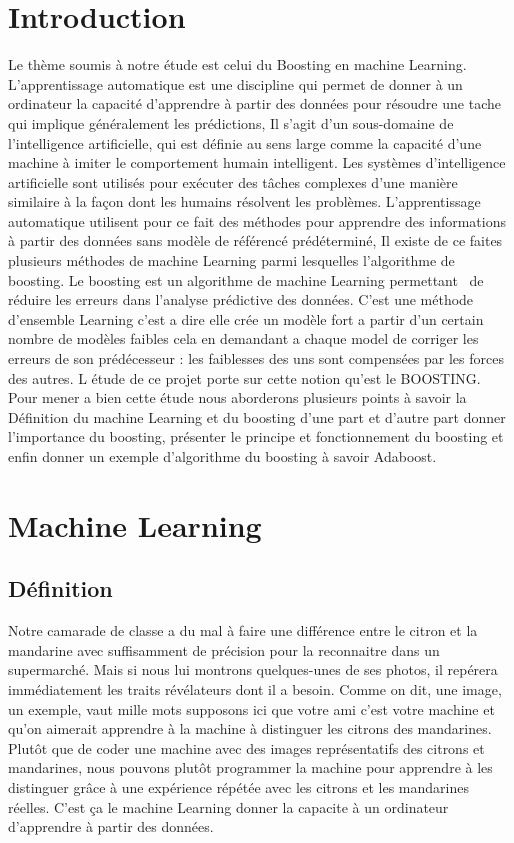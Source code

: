 \documentclass[french,a4paper,12pt]{article}
\begin{document}
 \begin{center}
 \tableofcontents
 \end{center}
\newpage



\section{Introduction}
\quad Le thème soumis à notre étude est celui du Boosting en machine Learning. L’apprentissage automatique est une discipline qui permet de donner à un ordinateur la capacité d’apprendre à partir des données pour résoudre une tache qui implique généralement les prédictions, Il s’agit d’un sous-domaine de l'intelligence artificielle, qui est définie au sens large comme la capacité d'une machine à imiter le comportement humain intelligent. Les systèmes d'intelligence artificielle sont utilisés pour exécuter des tâches complexes d'une manière similaire à la façon dont les humains résolvent les problèmes. L'apprentissage automatique utilisent pour ce fait des méthodes pour apprendre des informations à partir des données sans modèle de référencé prédéterminé, Il existe de ce faites plusieurs méthodes de machine Learning parmi lesquelles l’algorithme de boosting. Le boosting est un algorithme de machine Learning permettant \ de réduire les erreurs dans l’analyse prédictive des données. C’est une méthode d’ensemble Learning c’est a dire elle crée un modèle fort a partir d’un certain nombre de modèles faibles cela en demandant a chaque model de corriger les erreurs de son prédécesseur : les faiblesses des uns sont compensées par les forces des autres. L étude de ce projet porte sur cette notion qu’est le BOOSTING. Pour mener a bien cette étude nous aborderons plusieurs points à savoir la Définition du machine Learning et du boosting  d'une part et d'autre part donner l’importance du boosting, présenter le principe et fonctionnement du boosting et enfin donner  un exemple d’algorithme du boosting à savoir Adaboost. 




\newpage
\section{Machine Learning}
\subsection{Définition}
\quad Notre camarade de classe a du mal à faire une différence entre le citron et la mandarine avec suffisamment de précision pour la reconnaitre dans un supermarché. Mais si nous lui montrons quelques-unes de ses photos, il repérera immédiatement les traits révélateurs dont il a besoin. Comme on dit, une image, un exemple, vaut mille mots supposons ici que votre ami c’est votre machine et qu’on aimerait apprendre à la machine à distinguer les citrons des mandarines. Plutôt que de coder une machine avec des images représentatifs des citrons et mandarines, nous pouvons plutôt programmer la machine pour apprendre à les distinguer grâce à une expérience répétée avec les citrons et les mandarines réelles. C’est ça le machine Learning donner la capacite à un ordinateur d’apprendre à partir des données.
\end{document}
